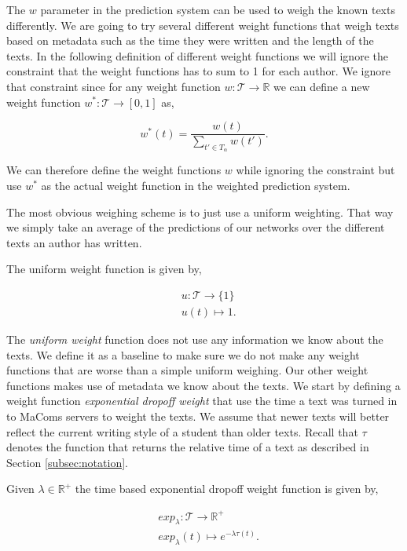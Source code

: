 The $w$ parameter in the prediction system can be used to weigh the known
texts differently. We are going to try several different weight functions
that weigh texts based on metadata such as the time they were written and the
length of the texts. In the following definition of different weight functions
we will ignore the constraint that the weight functions has to sum to 1 for
each author. We ignore that constraint since for any weight function $w \colon
\mathcal{T} \rightarrow \mathbb{R}$ we can define a new weight function $w^*
\colon \mathcal{T} \rightarrow [0, 1]$ as,

\begin{equation}\label{eq:normalize}
    w^*(t) = \frac{w(t)}{\sum_{t' \in T_\alpha} w(t')}.
\end{equation}

We can therefore define the weight functions $w$ while ignoring the constraint
but use $w^*$ as the actual weight function in the weighted prediction system.

The most obvious weighing scheme is to just use a uniform weighting. That way
we simply take an average of the predictions of our networks over the different
texts an author has written.

\begin{definition}
    \label{def:uniform_weight}

    The uniform weight function is given by,

    \begin{align}
        &u \colon \mathcal{T} \rightarrow \{ 1 \} \\
        &u(t) \mapsto 1.
    \end{align}

\end{definition}

The \textit{uniform weight} function does not use any information we know about
the texts. We define it as a baseline to make sure we do not make any weight
functions that are worse than a simple uniform weighing. Our other weight
functions makes use of metadata we know about the texts. We start by defining a
weight function \textit{exponential dropoff weight} that use the time a text was
turned in to MaComs servers to weight the texts. We assume that newer texts will
better reflect the current writing style of a student than older texts. Recall
that $\tau$ denotes the function that returns the relative time of a text as
described in Section \ref{subsec:notation}.

\begin{definition}
    \label{def:exponential_dropoff_weight}

    Given $\lambda \in \mathbb{R}^+$ the time based exponential dropoff weight
    function is given by,

    \begin{align}
        &exp_\lambda \colon \mathcal{T} \rightarrow \mathbb{R}^+ \\
        &exp_\lambda(t) \mapsto e^{-\lambda \tau(t)}.
    \end{align}

\end{definition}

